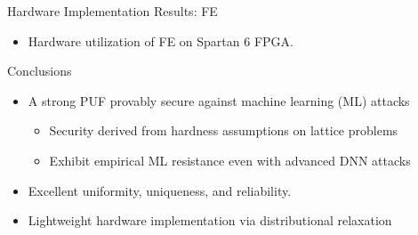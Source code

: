 \begin{frame}{Hardware Implementation Results: FE}
\begin{itemize}
    \item Hardware utilization of FE on Spartan 6 FPGA.
    \begin{table}
    \centering
    \label{table:hardware_fe}
\end{table}
\end{itemize}
\end{frame}

\begin{frame}{Conclusions}
\begin{itemize}
    \item  A strong PUF provably secure against machine learning (ML) attacks
    \begin{itemize}
        \item Security derived from hardness assumptions on lattice problems
        \item Exhibit empirical ML resistance even with advanced DNN attacks
    \end{itemize}
    \item Excellent uniformity, uniqueness, and reliability.
    \item Lightweight hardware implementation via distributional relaxation
\end{itemize}    
\end{frame}